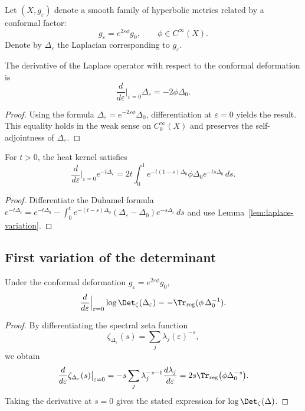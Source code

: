 Let $(X,g_\varepsilon)$ denote a smooth family of hyperbolic metrics related by a conformal factor:
\[
g_\varepsilon = e^{2\varepsilon\phi} g_0,
\qquad \phi \in C^\infty(X).
\]
Denote by $\Delta_\varepsilon$ the Laplacian corresponding to $g_\varepsilon$.

\begin{lemma}
\label{lem:laplace-variation}
The derivative of the Laplace operator with respect to the conformal deformation is
\[
\frac{d}{d\varepsilon}\Big|_{\varepsilon=0}\Delta_\varepsilon
= -2\phi\Delta_0.
\]
\]
\end{lemma}

\begin{proof}\relax
Using the formula $\Delta_\varepsilon = e^{-2\varepsilon\phi}\Delta_0$, differentiation at $\varepsilon=0$ yields the result.  
This equality holds in the weak sense on $C_0^\infty(X)$ and preserves the self-adjointness of $\Delta_\varepsilon$.
\end{proof}

\begin{lemma}
\label{lem:heat-variation}
For $t>0$, the heat kernel satisfies
\[
\frac{d}{d\varepsilon}\Big|_{\varepsilon=0} e^{-t\Delta_\varepsilon}
= 2t\int_0^1 e^{-t(1-s)\Delta_0}\phi\Delta_0 e^{-ts\Delta_0}\,ds.
\]
\end{lemma}

\begin{proof}\relax
Differentiate the Duhamel formula $e^{-t\Delta_\varepsilon}=e^{-t\Delta_0}-\int_0^t e^{-(t-s)\Delta_0}(\Delta_\varepsilon-\Delta_0)e^{-s\Delta_\varepsilon}\,ds$ and use Lemma~\ref{lem:laplace-variation}.
\end{proof}

\subsection{First variation of the determinant}
\label{subsec:ch4-part7-first-variation}
\relax

\begin{theorem}
\label{thm:first-variation}
Under the conformal deformation $g_\varepsilon=e^{2\varepsilon\phi}g_0$,
\[
\frac{d}{d\varepsilon}\Big|_{\varepsilon=0} \log\Det_\zeta(\Delta_\varepsilon)
= -\Tr_{\mathrm{reg}}(\phi\,\Delta_0^{-1}).
\]
\]
\end{theorem}

\begin{proof}\relax
By differentiating the spectral zeta function
\[
\zeta_{\Delta_\varepsilon}(s)=\sum_j\lambda_j(\varepsilon)^{-s},
\]
we obtain
\[
\frac{d}{d\varepsilon}\zeta_{\Delta_\varepsilon}(s)\big|_{\varepsilon=0}
= -s\sum_j \lambda_j^{-s-1}\frac{d\lambda_j}{d\varepsilon}
= 2s\Tr_{\mathrm{reg}}\big(\phi\Delta_0^{-s}\big).
\]
Taking the derivative at $s=0$ gives the stated expression for $\log\Det_\zeta(\Delta)$.
\end{proof}

